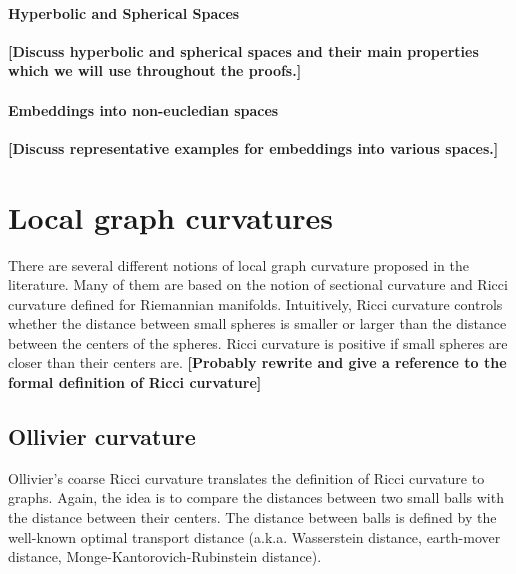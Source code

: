 \documentclass{article} %
\begin{document}
\fi

\paragraph{Hyperbolic and Spherical Spaces} \textbf{[Discuss hyperbolic and spherical spaces and their main properties which we will use throughout the proofs.]}

\paragraph{Embeddings into non-eucledian spaces} \textbf{[Discuss representative examples for embeddings into various spaces.]}

\section{Local graph curvatures}

There are several different notions of local graph curvature proposed in the literature. Many of them are based on the notion of sectional curvature and Ricci curvature defined for Riemannian manifolds. Intuitively, Ricci curvature controls whether the distance between small spheres is smaller or larger than the distance between the centers of the spheres. 
Ricci curvature is positive if
small spheres are closer than their centers are.
\textbf{[Probably rewrite and give a reference to the formal definition of Ricci curvature]}

\subsection{Ollivier curvature}

Ollivier's coarse Ricci curvature translates the definition of Ricci curvature to graphs. 
Again, the idea is to compare the distances between two small balls with the
distance between their centers. 
The distance between balls is defined by the well-known optimal transport
distance (a.k.a. Wasserstein distance, earth-mover distance,
Monge-Kantorovich-Rubinstein distance).
\end{document}
